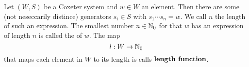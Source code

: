 \begin{defi}
	\label{length-function}
	Let $(W,S)$ be a Coxeter system and $w \in W$ an element. Then there are some (not neseccarily distince) generators $s_i \in S$ with $s_1 \cdots s_n = w$. We call $n$ the length of such an expression. The smallest number $n \in \mathbb{N}_0$ for that $w$ has an expression of length $n$ is called the  of $w$. The map
	$$ l : W \to \mathbb{N}_0 $$
	that maps each element in $W$ to its length is calls $\textbf{length function}$.
\end{defi}